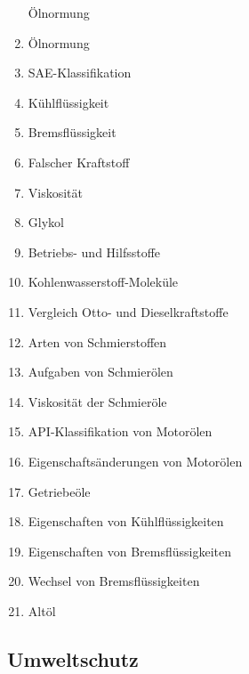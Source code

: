\begin{enumerate}
  Ölnormung\\
\item
  Ölnormung\\
\item
  SAE-Klassifikation\\
\item
  Kühlflüssigkeit\\
\item
  Bremsflüssigkeit\\
\item
  Falscher Kraftstoff\\
\item
  Viskosität\\
\item
  Glykol\\
\item
  Betriebs- und Hilfsstoffe\\
\item
  Kohlenwasserstoff-Moleküle\\
\item
  Vergleich Otto- und Dieselkraftstoffe\\
\item
  Arten von Schmierstoffen\\
\item
  Aufgaben von Schmierölen\\
\item
  Viskosität der Schmieröle\\
\item
  API-Klassifikation von Motorölen\\
\item
  Eigenschaftsänderungen von Motorölen\\
\item
  Getriebeöle\\
\item
  Eigenschaften von Kühlflüssigkeiten\\
\item
  Eigenschaften von Bremsflüssigkeiten\\
\item
  Wechsel von Bremsflüssigkeiten\\
\item
  Altöl
\end{enumerate}

\subsection{Umweltschutz}\label{umweltschutz}

